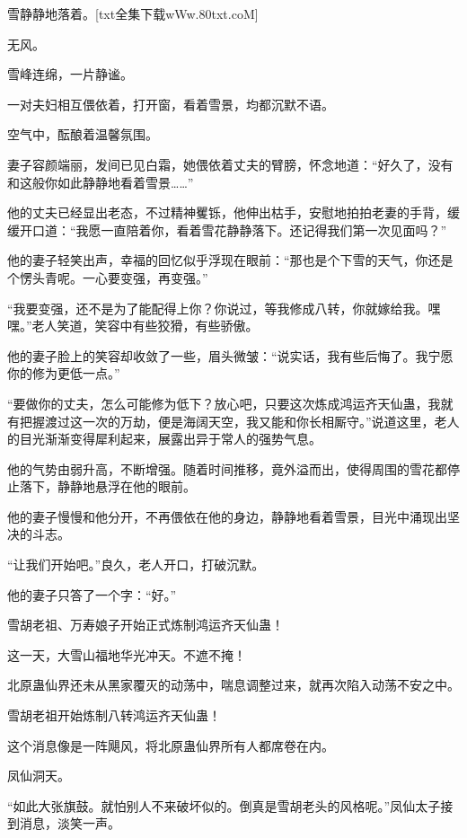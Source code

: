 
\begin{this_body}

雪静静地落着。[txt全集下载wWw.80txt.coM]

无风。

雪峰连绵，一片静谧。

一对夫妇相互偎依着，打开窗，看着雪景，均都沉默不语。

空气中，酝酿着温馨氛围。

妻子容颜端丽，发间已见白霜，她偎依着丈夫的臂膀，怀念地道：“好久了，没有和这般你如此静静地看着雪景……”

他的丈夫已经显出老态，不过精神矍铄，他伸出枯手，安慰地拍拍老妻的手背，缓缓开口道：“我愿一直陪着你，看着雪花静静落下。还记得我们第一次见面吗？”

他的妻子轻笑出声，幸福的回忆似乎浮现在眼前：“那也是个下雪的天气，你还是个愣头青呢。一心要变强，再变强。”

“我要变强，还不是为了能配得上你？你说过，等我修成八转，你就嫁给我。嘿嘿。”老人笑道，笑容中有些狡猾，有些骄傲。

他的妻子脸上的笑容却收敛了一些，眉头微皱：“说实话，我有些后悔了。我宁愿你的修为更低一点。”

“要做你的丈夫，怎么可能修为低下？放心吧，只要这次炼成鸿运齐天仙蛊，我就有把握渡过这一次的万劫，便是海阔天空，我又能和你长相厮守。”说道这里，老人的目光渐渐变得犀利起来，展露出异于常人的强势气息。

他的气势由弱升高，不断增强。随着时间推移，竟外溢而出，使得周围的雪花都停止落下，静静地悬浮在他的眼前。

他的妻子慢慢和他分开，不再偎依在他的身边，静静地看着雪景，目光中涌现出坚决的斗志。

“让我们开始吧。”良久，老人开口，打破沉默。

他的妻子只答了一个字：“好。”

雪胡老祖、万寿娘子开始正式炼制鸿运齐天仙蛊！

这一天，大雪山福地华光冲天。不遮不掩！

北原蛊仙界还未从黑家覆灭的动荡中，喘息调整过来，就再次陷入动荡不安之中。

雪胡老祖开始炼制八转鸿运齐天仙蛊！

这个消息像是一阵飓风，将北原蛊仙界所有人都席卷在内。

凤仙洞天。

“如此大张旗鼓。就怕别人不来破坏似的。倒真是雪胡老头的风格呢。”凤仙太子接到消息，淡笑一声。


\end{this_body}

